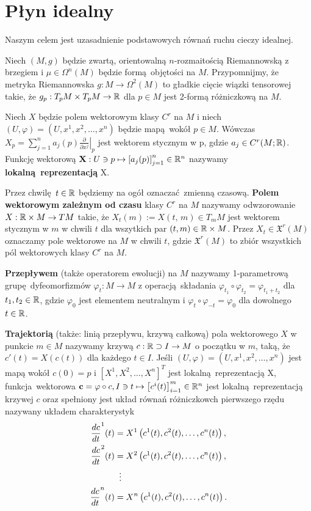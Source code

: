 \chapter{Płyn idealny} Naszym celem jest uzasadnienie podstawowych równań ruchu cieczy idealnej. 

Niech \((M, g)\) będzie zwartą, orientowalną \(n\)-rozmaitością Riemannowską z brzegiem i \(\mu \in \Omega^n(M)\) będzie formą objętości na \(M\). Przypomnijmy, że metryka Riemannowska \(g: M \rightarrow \Omega^2(M)\) to gładkie cięcie wiązki tensorowej takie, że \(g_p: T_p M \times T_p M \rightarrow \mathbb{R}\) dla \(p\in M\) jest 2-formą różniczkową na \(M\).

Niech \(X\) będzie polem wektorowym klasy \(C^r\) na \(M\) i niech \((U, \varphi) = (U, x^1, x^2, \dots, x^n)\) będzie mapą wokół \(p\in M\). Wówczas \(X_p = \sum_{j=1}^{n}a_j(p)\left.\frac{\partial}{\partial x^j}\right|_p\) jest wektorem stycznym w p, gdzie \(a_j\in C^r(M; \mathbb{R})\). Funkcję wektorową \(\mathbf{X}: U\ni p \mapsto \left[a_j(p)\right]_{j=1}^n\in \mathbb{R}^n\) nazywamy \textbf{lokalną reprezentacją} X.

Przez chwilę \(t\in\mathbb{R}\) będziemy na ogół oznaczać zmienną czasową. \textbf{Polem wektorowym zależnym od czasu} klasy \(C^r\) na \(M\) nazywamy odwzorowanie \(X:\mathbb{R}\times M\rightarrow TM\) takie, że \(X_t(m):=X(t,\,m) \in T_{m} M\) jest wektorem stycznym w \(m\) w chwili \(t\) dla wszytkich par \((t, m) \in \mathbb{R} \times M\). Przez \(X_t\in \mathfrak{X}^r(M)\) oznaczamy pole wektorowe na \(M\) w chwili \(t\), gdzie \(\mathfrak{X}^r(M)\) to zbiór wszystkich pól wektorowych klasy \(C^r\) na \(M\). 

\textbf{Przepływem} (także operatorem ewolucji) na \(M\) nazywamy 1-parametrową grupę dyfeomorfizmów \(\varphi_t: M \rightarrow M\) z operacją składania \(\varphi_{t_1}\circ\varphi_{t_2} = \varphi_{t_1 + t_2}\) dla \(t_{1}, {t}_2 \in \mathbb{R}\), gdzie \(\varphi_0\) jest elementem neutralnym i \(\varphi_{t}\circ\varphi_{-t} = \varphi_0\) dla dowolnego \(t\in\mathbb{R}\).  

\textbf{Trajektorią} (także: linią przepływu, krzywą całkową) pola wektorowego \(X\) w punkcie \(m\in M\) nazywamy krzywą \(c: \mathbb{R} \supset I \rightarrow M\) o początku w \(m\), taką, że \(c'(t) = X(c(t))\) dla każdego \(t\in I\). Jeśli \((U, \varphi) = (U, x^1, x^2, \dots, x^n)\) jest mapą wokół \(c(0)=p\) i \([X^1, X^2, \dots, X^n]^T\) jest lokalną reprezentacją X, funkcja wektorowa \(\mathbf{c} = \varphi \circ c, I \ni t \mapsto \left[c^i(t)\right]_{i=1}^m \in \mathbb{R}^n\) jest lokalną reprezentacją krzywej \(c\) oraz spełniony jest układ równań różniczkowch pierwszego rzędu nazywany układem charakterystyk
\begin{align*}
    \frac{dc}{dt}^1(t) &= X^1\left(c^1(t), c^2(t), \dots, c^n(t)\right),\\
    \frac{dc}{dt}^2(t) &= X^2\left(c^1(t), c^2(t), \dots, c^n(t)\right),\\
    &\mathrel{\makebox[\widthof{=}]{\vdots}}  \\
    \frac{dc}{dt}^n(t) &= X^n\left(c^1(t), c^2(t), \dots, c^n(t)\right).
\end{align*}

